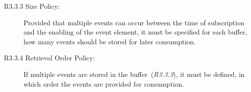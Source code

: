 \begin{description}
	\item[R3.3.3 Size Policy:]
	Provided that multiple events can occur between the time of subscription and the enabling of the event element, it must be specified for each buffer, how many events should be stored for later consumption.
	
	\item[R3.3.4 Retrieval Order Policy:]
	If multiple events are stored in the buffer~(\textit{R3.3.3}), it must be defined, in which order the events are provided for consumption. 
	
\end{description}



